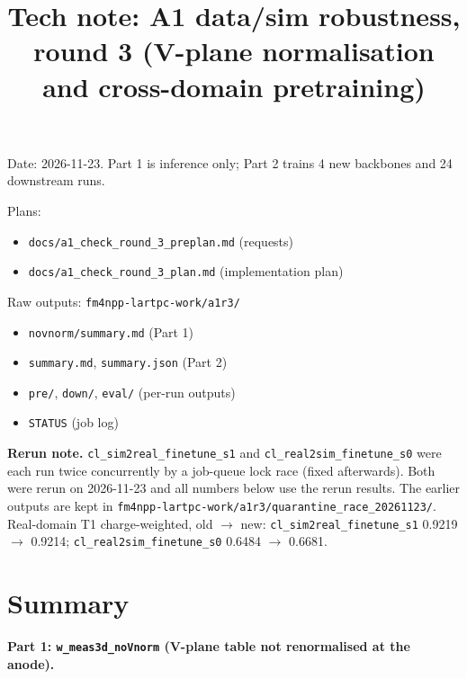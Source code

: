\documentclass[10pt,a4paper]{article}
\title{\textbf{Tech note: A1 data/sim robustness, round 3 (V-plane normalisation and cross-domain pretraining)}}
\author{}
\date{}
\begin{document}
\maketitle
\vspace{-3em}
Date: 2026-11-23. Part 1 is inference only; Part 2 trains 4 new backbones and 24 downstream runs.

Plans:

\begin{itemize}
\item \texttt{docs/\allowbreak{}a1\_\allowbreak{}check\_\allowbreak{}round\_\allowbreak{}3\_\allowbreak{}preplan.md} (requests)
\item \texttt{docs/\allowbreak{}a1\_\allowbreak{}check\_\allowbreak{}round\_\allowbreak{}3\_\allowbreak{}plan.md} (implementation plan)
\end{itemize}
Raw outputs: \texttt{fm4npp-lartpc-work/\allowbreak{}a1r3/\allowbreak{}}

\begin{itemize}
\item \texttt{novnorm/\allowbreak{}summary.md} (Part 1)
\item \texttt{summary.md}, \texttt{summary.json} (Part 2)
\item \texttt{pre/\allowbreak{}}, \texttt{down/\allowbreak{}}, \texttt{eval/\allowbreak{}} (per-run outputs)
\item \texttt{STATUS} (job log)
\end{itemize}
\textbf{Rerun note.} \texttt{cl\_\allowbreak{}sim2real\_\allowbreak{}finetune\_\allowbreak{}s1} and \texttt{cl\_\allowbreak{}real2sim\_\allowbreak{}finetune\_\allowbreak{}s0} were each run twice concurrently by a job-queue lock race (fixed afterwards). Both were rerun on 2026-11-23 and all numbers below use the rerun results. The earlier outputs are kept in \texttt{fm4npp-lartpc-work/\allowbreak{}a1r3/\allowbreak{}quarantine\_\allowbreak{}race\_\allowbreak{}20261123/\allowbreak{}}. Real-domain T1 charge-weighted, old $\rightarrow$ new: \texttt{cl\_\allowbreak{}sim2real\_\allowbreak{}finetune\_\allowbreak{}s1} 0.9219 $\rightarrow$ 0.9214; \texttt{cl\_\allowbreak{}real2sim\_\allowbreak{}finetune\_\allowbreak{}s0} 0.6484 $\rightarrow$ 0.6681.

\section*{Summary}
\textbf{Part 1: \texttt{w\_\allowbreak{}meas3d\_\allowbreak{}noVnorm} (V-plane table not renormalised at the anode).}
\end{document}
